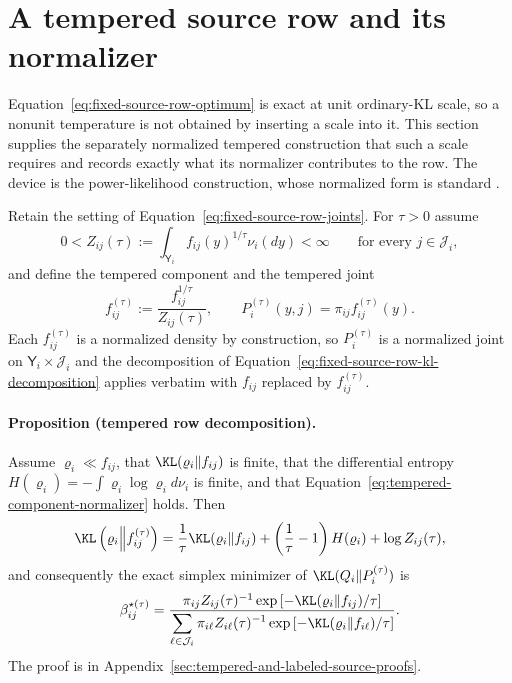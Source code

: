 \section{A tempered source row and its normalizer}
\label{sec:tempered-source-row}

Equation~\eqref{eq:fixed-source-row-optimum} is exact at unit ordinary-KL scale, so a nonunit temperature is not obtained by inserting a scale into it. This section supplies the separately normalized tempered construction that such a scale requires and records exactly what its normalizer contributes to the row. The device is the power-likelihood construction, whose normalized form is standard \citep{BissiriHolmesWalker2016}.

Retain the setting of Equation~\eqref{eq:fixed-source-row-joints}. For \(\tau>0\) assume
\begin{equation}
0<Z_{ij}(\tau)
:=\int_{\mathsf Y_i}f_{ij}(y)^{1/\tau}\nu_i(dy)<\infty
\qquad\text{for every }j\in\mathcal J_i,
\label{eq:tempered-component-normalizer}
\end{equation}
and define the tempered component and the tempered joint
\begin{equation}
f_{ij}^{(\tau)}:=\frac{f_{ij}^{1/\tau}}{Z_{ij}(\tau)},
\qquad
P_i^{(\tau)}(y,j)=\pi_{ij}f_{ij}^{(\tau)}(y).
\label{eq:tempered-source-joint}
\end{equation}
Each \(f_{ij}^{(\tau)}\) is a normalized density by construction, so \(P_i^{(\tau)}\) is a normalized joint on \(\mathsf Y_i\times\mathcal J_i\) and the decomposition of Equation~\eqref{eq:fixed-source-row-kl-decomposition} applies verbatim with \(f_{ij}\) replaced by \(f_{ij}^{(\tau)}\).

\paragraph{Proposition (tempered row decomposition).}
\label{prop:tempered-row-decomposition}
Assume \(\varrho_i\ll f_{ij}\), that \(\KL(\varrho_i\Vert f_{ij})\) is finite, that the differential entropy \(H(\varrho_i)=-\int\varrho_i\log\varrho_i d\nu_i\) is finite, and that Equation~\eqref{eq:tempered-component-normalizer} holds. Then
\begin{equation}
\KL\left(\varrho_i\middle\Vert f_{ij}^{(\tau)}\right)
=\frac{1}{\tau}\KL(\varrho_i\Vert f_{ij})
+\left(\frac1\tau-1\right)H(\varrho_i)
+\log Z_{ij}(\tau),
\label{eq:tempered-kl-decomposition}
\end{equation}
and consequently the exact simplex minimizer of \(\KL(Q_i\Vert P_i^{(\tau)})\) is
\begin{equation}
\beta_{ij}^{\star(\tau)}
=\frac{\pi_{ij}Z_{ij}(\tau)^{-1}\exp\left[-\KL(\varrho_i\Vert f_{ij})/\tau\right]}
{\displaystyle\sum_{\ell\in\mathcal J_i}
\pi_{i\ell}Z_{i\ell}(\tau)^{-1}\exp\left[-\KL(\varrho_i\Vert f_{i\ell})/\tau\right]}.
\label{eq:tempered-source-row-optimum}
\end{equation}
The proof is in Appendix~\ref{sec:tempered-and-labeled-source-proofs}.

